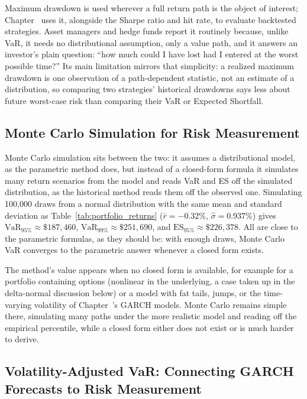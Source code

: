 \documentclass[../ai_in_finance]{subfiles}
\begin{document}
Maximum drawdown is used wherever a full return path is the object of interest; Chapter~ uses it, alongside the Sharpe ratio and hit rate, to evaluate backtested strategies. Asset managers and hedge funds report it routinely because, unlike VaR, it needs no distributional assumption, only a value path, and it answers an investor's plain question: ``how much could I have lost had I entered at the worst possible time?''
Its main limitation mirrors that simplicity: a realized maximum drawdown is one observation of a path-dependent statistic, not an estimate of a distribution, so comparing two strategies' historical drawdowns says less about future worst-case risk than comparing their VaR or Expected Shortfall.

\subsection{Monte Carlo Simulation for Risk Measurement}

Monte Carlo simulation sits between the two: it assumes a distributional model, as the parametric method does, but instead of a closed-form formula it simulates many return scenarios from the model and reads VaR and ES off the simulated distribution, as the historical method reads them off the observed one.
Simulating 100,000 draws from a normal distribution with the same mean and standard deviation as Table~\ref{tab:portfolio_returns} ($\bar r=-0.32\%$, $\hat\sigma=0.937\%$) gives $\text{VaR}_{95\%} \approx \$187{,}460$, $\text{VaR}_{99\%} \approx \$251{,}690$, and $\text{ES}_{95\%} \approx \$226{,}378$. All are close to the parametric formulas, as they should be: with enough draws, Monte Carlo VaR converges to the parametric answer whenever a closed form exists.

The method's value appears when no closed form is available, for example for a portfolio containing options (nonlinear in the underlying, a case taken up in the delta-normal discussion below) or a model with fat tails, jumps, or the time-varying volatility of Chapter~'s GARCH models. Monte Carlo remains simple there, simulating many paths under the more realistic model and reading off the empirical percentile, while a closed form either does not exist or is much harder to derive.

\subsection{Volatility-Adjusted VaR: Connecting GARCH Forecasts to Risk Measurement}
\label{sec:garch-var}
\end{document}
